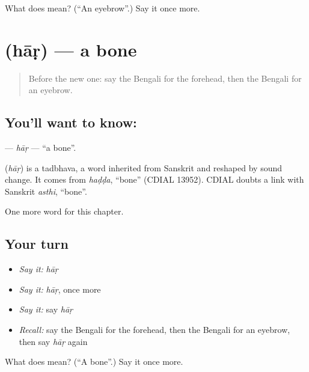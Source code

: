 \begin{tcolorbox}[breakable,colback=teal!4,colframe=teal!35!black,title={Before you move on}]
What does  mean? (\textquotedblleft{}An eyebrow\textquotedblright{}.) Say it once more.
\end{tcolorbox}
\section[\texorpdfstring{\bn{হাড়} (hāṛ)}{হাড় (hāṛ)}]{ (hāṛ) — a bone}

\label{lesson:BN-C124-har2}



\begin{quote}
Before the new one: say the Bengali for the forehead, then the Bengali for an eyebrow.
\end{quote}

\subsection*{You'll want to know: }
\textbf{} — \emph{hāṛ} — \textquotedblleft{}a bone\textquotedblright{}.

\begin{cousinweb}
\textbf{} (\emph{hāṛ}) is a tadbhava, a word inherited from Sanskrit and reshaped by sound change. It comes from \emph{haḍḍa}, \textquotedblleft{}bone\textquotedblright{} (CDIAL 13952). CDIAL doubts a link with Sanskrit \emph{asthi}, \textquotedblleft{}bone\textquotedblright{}.
\end{cousinweb}

\begin{grammarlens}[title={What you've built}]
One more word for this chapter.
\end{grammarlens}

\subsection*{Your turn}
\begin{itemize}
\raggedright
  \item \emph{Say it:} \emph{hāṛ}
  \item \emph{Say it:} \emph{hāṛ}, once more
  \item \emph{Say it:} say \emph{hāṛ}
  \item \emph{Recall:} say the Bengali for the forehead, then the Bengali for an eyebrow, then say \emph{hāṛ} again
\end{itemize}

\begin{tcolorbox}[breakable,colback=teal!4,colframe=teal!35!black,title={Before you move on}]
What does  mean? (\textquotedblleft{}A bone\textquotedblright{}.) Say it once more.
\end{tcolorbox}
